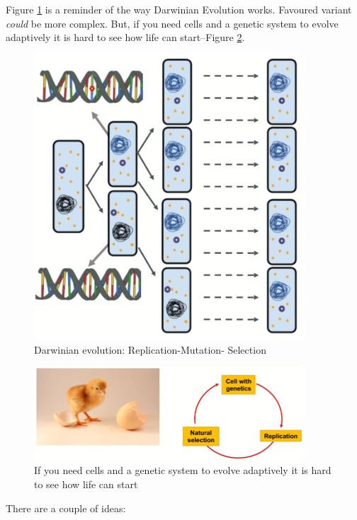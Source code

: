 \documentclass[]{article}
\begin{document}
Figure \ref{fig:ReplicationMutationSelection} is a reminder of the way Darwinian Evolution works. Favoured variant \textit{could} be more complex. But, if you need cells and a genetic system to evolve adaptively it is hard to see how life can start--Figure \ref{fig:ChickenEgg}.
\begin{figure}[H]
	\caption{Darwinian evolution: Replication-Mutation- Selection}\label{fig:ReplicationMutationSelection}
	\includegraphics[width=0.9\textwidth]{ReplicationMutationSelection}
\end{figure}

\begin{figure}[H]
	\caption[If you need cells and a genetic system to evolve adaptively...]{If you need cells and a genetic system to evolve adaptively it is hard to see how life can start}\label{fig:ChickenEgg}
	\includegraphics[width=0.9\textwidth]{ChickenEgg}
\end{figure}

There are a couple of ideas:
\end{document}
